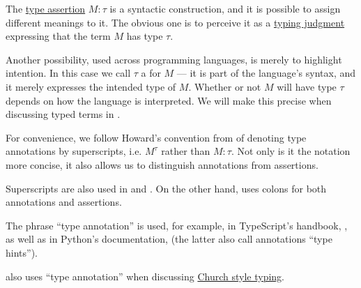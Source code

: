 \begin{concept}\label{con:type_annotation}
  The \hyperref[def:type_assertion]{type assertion} \( M: \tau \) is a syntactic construction, and it is possible to assign different meanings to it. The obvious one is to perceive it as a \hyperref[rem:typing_judgments]{typing judgment} expressing that the term \( M \) has type \( \tau \).

  Another possibility, used across programming languages, is merely to highlight intention. In this case we call \( \tau \) a  for \( M \) --- it is part of the language's syntax, and it merely expresses the intended type of \( M \). Whether or not \( M \) will have type \( \tau \) depends on how the language is interpreted. We will make this precise when discussing typed terms in .

  For convenience, we follow Howard's convention from \cite{Howard1980FormulasAsTypes} of denoting type annotations by superscripts, i.e. \( M^\tau \) rather than \( M: \tau \). Not only is it the notation more concise, it also allows us to distinguish annotations from assertions.
\end{concept}
\begin{comments}
  \item Superscripts are also used in \cite{Mimram2020ProgramEqualsProof} and \cite[ch. 5]{Hindley1997BasicSTT}. On the other hand,  uses colons for both annotations and assertions.

  \item The phrase \enquote{type annotation} is used, for example, in TypeScript's handbook, \cite{TypeScriptDocs:5.7:handbook}, as well as in Python's documentation, \cite{PythonDocs:3.13:typing} (the latter also call annotations \enquote{type hints}).

   also uses \enquote{type annotation} when discussing \hyperref[rem:typing_style]{Church style typing}.
\end{comments}

